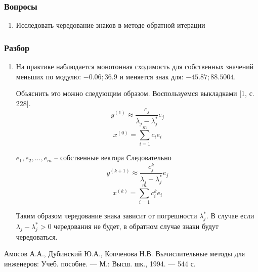 \documentclass[12pt]{article}
\date{}
\author{}
\begin{document}
\subsubsection*{Вопросы}
\begin{enumerate}
	\item Исследовать чередование знаков в методе обратной итерации
\end{enumerate}



\subsubsection*{Разбор}
\begin{enumerate}	
\item На практике наблюдается монотонная сходимость для собственных значений меньших по модулю: $-0.06; 36.9$ и меняется знак для: $-45.87; 88.5004$.

Объяснить это можно следующим образом. Воспользуемся выкладками [1, с. 228].
$$ y^{(1)} \approx \frac{c_{j}}{\lambda_{j}-\lambda_{j}^{*}} e_{j} $$
$$ x^{(0)}=\sum_{i=1}^{m} c_{i} e_{i} $$

$e_{1},e_{2}, \ldots, e_{m}$ -- собственные вектора
Следовательно
$$ y^{(k + 1)} \approx \frac{c_{j}^{k}}{\lambda_{j}-\lambda_{j}^{*}} e_{j} $$
$$ x^{(k)}=\sum_{i=1}^{m} c_{i}^{k} e_{i} $$

Таким образом чередование знака зависит от погрешности $\lambda_{j}^{*}$. В случае
если $\lambda_{j}-\lambda_{j}^{*} > 0$ чередования не будет, в обратном случае знаки будут чередоваться.
\end{enumerate}

\begin{thebibliography}{3}
Амосов А.А., Дубинский Ю.А., Копченова Н.В. Вычислительные методы для инженеров: Учеб. пособие. — М.: Высш. шк., 1994. — 544 с.
	
\end{thebibliography}
\end{document}
